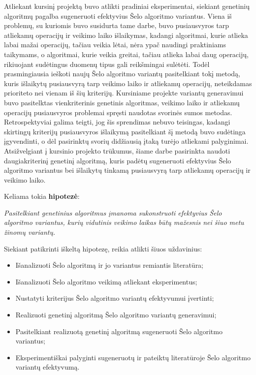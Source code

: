 \documentclass{VUMIFInfBakalaurinis}
\begin{document}
Atliekant kursinį projektą buvo atlikti pradiniai eksperimentai, siekiant genetinių algoritmų pagalba sugeneruoti efektyvius Šelo algoritmo variantus.
Viena iš problemų, su kuriomis buvo susidurta tame darbe, buvo pusiausvyros tarp atliekamų operacijų ir veikimo laiko išlaikymas, kadangi
algoritmai, kurie atlieka labai mažai operacijų, tačiau veikia lėtai, nėra ypač naudingi praktiniams taikymams, o  
algoritmai, kurie veikia greitai, tačiau atlieka labai daug operacijų, rikiuojant sudėtingus duomenų tipus gali reikšmingai sulėtėti.
Todėl prasmingiausia ieškoti naujų Šelo algoritmo variantų pasitelkiant tokį metodą, kuris išlaikytų pusiausvyrą tarp veikimo laiko ir atliekamų operacijų,
neteikdamas prioriteto nei vienam iš šių kriterijų.
Kursiniame projekte variantų generavimui buvo pasitelktas vienkriterinis genetinis algoritmas, veikimo laiko ir atliekamų operacijų pusiausvyros problemai spręsti
naudotas svorinės sumos metodas.
Retrospektyviai galima teigti, jog šis sprendimas nebuvo teisingas, kadangi skirtingų kriterijų pusiausvyros išlaikymą
pasitelkiant šį metodą buvo sudėtinga įgyvendinti, o dėl pasirinktų svorių didžiausią įtaką turėjo atliekami palyginimai.
Atsižvelgiant į kursinio projekto trūkumus, šiame darbe pasirinkta naudoti daugiakriterinį genetinį algoritmą, kuris
padėtų sugeneruoti efektyvius Šelo algoritmo variantus bei išlaikytų tinkamą pusiausvyrą tarp atliekamų operacijų ir veikimo laiko.

\pagebreak

Keliama tokia \textbf{hipotezė}:

\textit{Pasitelkiant genetinius algoritmus įmanoma sukonstruoti efektyvius Šelo algoritmo variantus,
kurių vidutinis veikimo laikas būtų mažesnis nei šiuo metu žinomų variantų.}

\medskip

Siekiant patikrinti iškeltą hipotezę, reikia atlikti šiuos uždavinius:
\begin{itemize}
    \item Išanalizuoti Šelo algoritmą ir jo variantus remiantis literatūra;
    \item Išanalizuoti Šelo algoritmo veikimą atliekant eksperimentus;
    \item Nustatyti kriterijus Šelo algoritmo variantų efektyvumui įvertinti;
    \item Realizuoti genetinį algoritmą Šelo algoritmo variantų generavimui;
    \item Pasitelkiant realizuotą genetinį algoritmą sugeneruoti Šelo algoritmo variantus;
    \item Eksperimentiškai palyginti sugeneruotų ir pateiktų literatūroje Šelo algoritmo variantų efektyvumą.
  \end{itemize}
\end{document}
